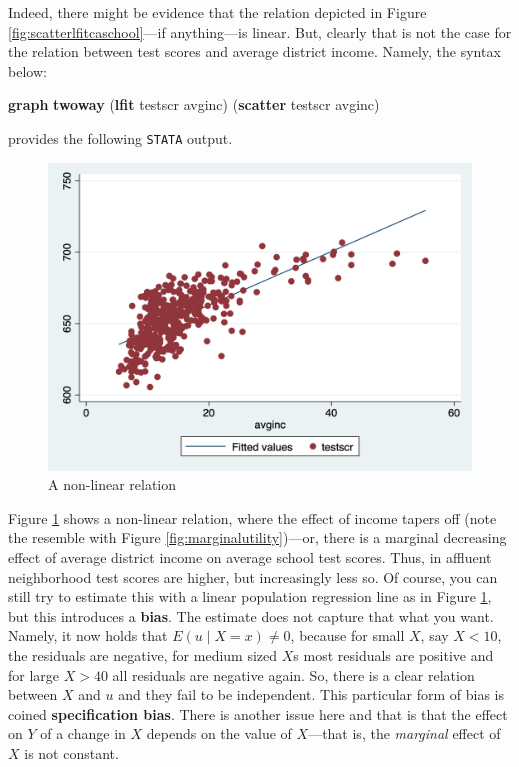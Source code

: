 \documentclass[
]{book}
\newenvironment{Shaded}{\begin{snugshade}}{\end{snugshade}}
\newcommand{\KeywordTok}[1]{\textcolor[rgb]{0.13,0.29,0.53}{\textbf{#1}}}
\newcommand{\NormalTok}[1]{#1}
\begin{document}
Indeed, there might be evidence that the relation depicted in Figure \ref{fig:scatterlfitcaschool}---if anything---is linear. But, clearly that is not the case for the relation between test scores and average district income. Namely, the syntax below:

\begin{Shaded}
\begin{Highlighting}[]
\KeywordTok{graph} \KeywordTok{twoway}\NormalTok{ (}\KeywordTok{lfit}\NormalTok{ testscr avginc) (}\KeywordTok{scatter}\NormalTok{ testscr avginc)}
\end{Highlighting}
\end{Shaded}

provides the following \texttt{STATA} output.

\begin{figure}

{\centering \includegraphics[width=600px]{./figures/scatterincome} 

}

\caption{A non-linear relation}\label{fig:scatterincome}
\end{figure}

Figure \ref{fig:scatterincome} shows a non-linear relation, where the effect of income tapers off (note the resemble with Figure \ref{fig:marginalutility})---or, there is a marginal decreasing effect of average district income on average school test scores. Thus, in affluent neighborhood test scores are higher, but increasingly less so. Of course, you can still try to estimate this with a linear population regression line as in Figure \ref{fig:scatterincome}, but this introduces a \textbf{bias}. The estimate does not capture that what you want. Namely, it now holds that \(E(u \mid X = x) \neq 0\), because for small \(X\), say \(X<10\), the residuals are negative, for medium sized \(X\)s most residuals are positive and for large \(X>40\) all residuals are negative again. So, there is a clear relation between \(X\) and \(u\) and they fail to be independent. This particular form of bias is coined \textbf{specification bias}. There is another issue here and that is that the effect on \(Y\) of a change in \(X\) depends on the value of \(X\)---that is, the \emph{marginal} effect of \(X\) is not constant.
\end{document}
